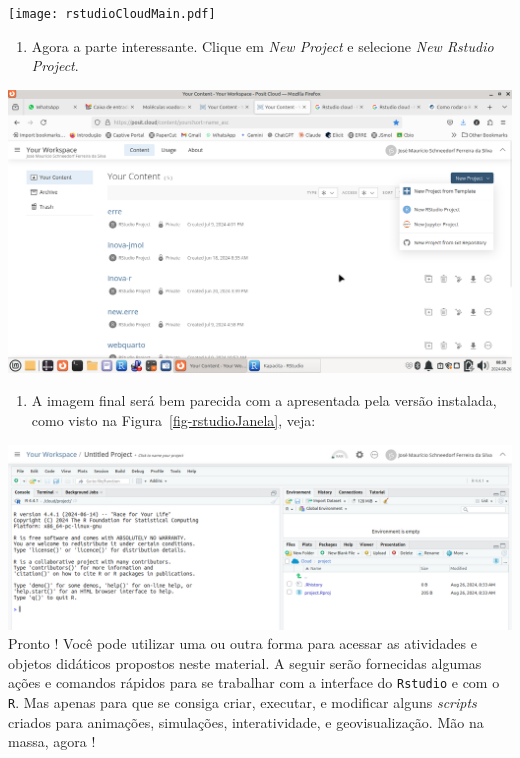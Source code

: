 \documentclass[
  letterpaper,
  DIV=11,
  numbers=noendperiod]{scrreprt}
\providecommand{\tightlist}{%
  \setlength{\itemsep}{0pt}\setlength{\parskip}{0pt}}\usepackage{longtable,booktabs,array}
\begin{document}
\texttt{[image: rstudioCloudMain.pdf]}

\begin{enumerate}
\def\labelenumi{\arabic{enumi}.}
\setcounter{enumi}{3}
\tightlist
\item
  Agora a parte interessante. Clique em \emph{New Project} e selecione
  \emph{New Rstudio Project}.
\end{enumerate}

\includegraphics{rstudioCloudNewProj.png}

\begin{enumerate}
\def\labelenumi{\arabic{enumi}.}
\setcounter{enumi}{4}
\tightlist
\item
  A imagem final será bem parecida com a apresentada pela versão
  instalada, como visto na Figura~\ref{fig-rstudioJanela}, veja:
\end{enumerate}

\includegraphics{rstudioCloudFinal.png} \textbar{} Pronto ! Você pode
utilizar uma ou outra forma para acessar as atividades e objetos
didáticos propostos neste material. A seguir serão fornecidas algumas
ações e comandos rápidos para se trabalhar com a interface do
\texttt{Rstudio} e com o \texttt{R}. Mas apenas para que se consiga
criar, executar, e modificar alguns \emph{scripts} criados para
animações, simulações, interatividade, e geovisualização. Mão na massa,
agora !
\end{document}
